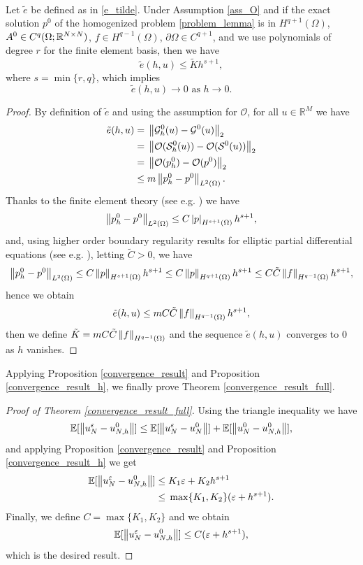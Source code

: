 \documentclass[10pt]{article}
\begin{document}
\begin{lemma}
\label{fh_goes_to_0}
\leavevmode \\
Let $\tilde{e}$ be defined as in \eqref{e_tilde}. Under Assumption \ref{ass_O} and if the exact solution $p^0$ of the homogenized problem \eqref{problem_lemma} is in $H^{q+1}(\Omega)$, $A^0 \in C^q(\Omega;\mathbb{R}^{N \times N})$, $f \in H^{q-1}(\Omega)$, $\partial \Omega \in C^{q+1}$, and we use polynomials of degree $r$ for the finite element basis, then we have 
\[ \tilde{e}(h, u) \le \tilde{K} h^{s+1}, \]
where $s = \min \{ r, q \}$, which implies
\[ \tilde{e}(h, u) \to 0 \text{ as } h \to 0. \]
\end{lemma}
\begin{proof}
By definition of $\tilde{e}$ and using the assumption for $\mathcal{O}$, for all $u \in \mathbb{R}^M$ we have
\begin{align*}
\tilde{e}(h, u) = & \; \left\|\mathcal{G}^0_h(u) - \mathcal{G}^0(u)\right\|_2 \\
= & \; \left\|\mathcal{O}(\mathcal{S}^0_h(u)) - \mathcal{O}(\mathcal{S}^0(u))\right\|_2 \\
= & \; \left\|\mathcal{O}(p^0_h) - \mathcal{O}(p^0)\right\|_2 \\
\le & \; m \left\|p^0_h - p^0\right\|_{L^2(\Omega)}.
\end{align*}
Thanks to the finite element theory (see e.g. \cite[Theorem 4.7]{Qua09}) we have 
\[ \left\|p^0_h - p^0\right\|_{L^2(\Omega)} \le C \left\lvert p\right\rvert_{H^{s+1}(\Omega)} h^{s+1}, \]
and, using higher order boundary regularity results for elliptic partial differential equations (see e.g. \cite[Theorem 6.3.5]{Eva10}), letting $\tilde{C} > 0$, we have
\[ \left\|p^0_h - p^0\right\|_{L^2(\Omega)} \le C \left\|p\right\|_{H^{s+1}(\Omega)} h^{s+1} \le C \left\|p\right\|_{H^{q+1}(\Omega)} h^{s+1} \le C \tilde{C} \left\|f\right\|_{H^{q-1}(\Omega)} h^{s+1}, \]
hence we obtain
\[ \tilde{e}(h, u) \le m C \tilde{C} \left\|f\right\|_{H^{q-1}(\Omega)} h^{s+1}, \]
then we define $\tilde{K} = m C \tilde{C} \left\|f\right\|_{H^{q-1}(\Omega)}$ and the sequence $\tilde{e}(h, u)$ converges to $0$ as $h$ vanishes.
\end{proof}

Applying Proposition \ref{convergence_result} and Proposition \ref{convergence_result_h}, we finally prove Theorem \ref{convergence_result_full}.
\begin{proof}[Proof of Theorem \ref{convergence_result_full}]
Using the triangle inequality we have
\[ \mathbb{E}[ \left\|u_N^{\varepsilon} - u_{N,h}^0\right\| ] \le \mathbb{E} [ \left\|u_N^{\varepsilon} - u_N^0\right\| ] + \mathbb{E} [ \left\|u_N^0 - u_{N,h}^0\right\| ], \]
and applying Proposition \ref{convergence_result} and Proposition \ref{convergence_result_h} we get
\begin{align*}
\mathbb{E}[ \left\|u_N^{\varepsilon} - u_{N,h}^0\right\| ] \le & \; K_1 \varepsilon + K_2 h^{s+1} \\
\le & \; \max \{ K_1, K_2 \} (\varepsilon + h^{s+1}).
\end{align*}
Finally, we define $C = \max \{ K_1, K_2 \}$ and we obtain
\begin{equation*}
\mathbb{E}[ \left\|u_N^{\varepsilon} - u_{N,h}^0\right\| ] \le C (\varepsilon + h^{s+1}),
\end{equation*}
which is the desired result.
\end{proof}
\end{document}

